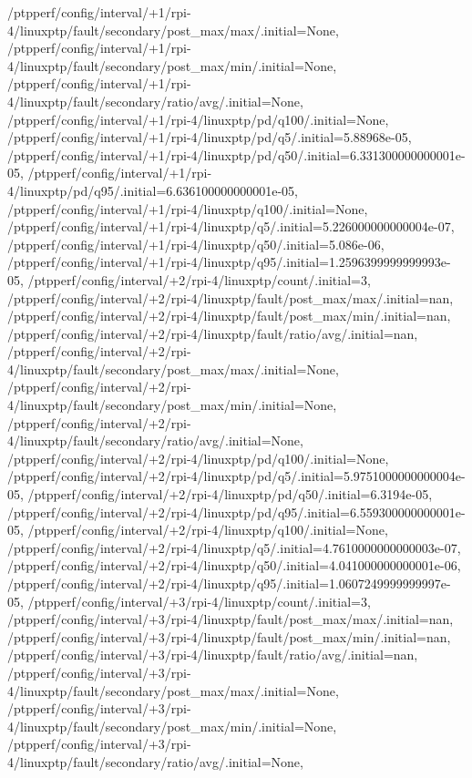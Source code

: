 {    /ptpperf/config/interval/+1/rpi-4/linuxptp/fault/secondary/post_max/max/.initial=None,
    /ptpperf/config/interval/+1/rpi-4/linuxptp/fault/secondary/post_max/min/.initial=None,
    /ptpperf/config/interval/+1/rpi-4/linuxptp/fault/secondary/ratio/avg/.initial=None,
    /ptpperf/config/interval/+1/rpi-4/linuxptp/pd/q100/.initial=None,
    /ptpperf/config/interval/+1/rpi-4/linuxptp/pd/q5/.initial=5.88968e-05,
    /ptpperf/config/interval/+1/rpi-4/linuxptp/pd/q50/.initial=6.331300000000001e-05,
    /ptpperf/config/interval/+1/rpi-4/linuxptp/pd/q95/.initial=6.636100000000001e-05,
    /ptpperf/config/interval/+1/rpi-4/linuxptp/q100/.initial=None,
    /ptpperf/config/interval/+1/rpi-4/linuxptp/q5/.initial=5.226000000000004e-07,
    /ptpperf/config/interval/+1/rpi-4/linuxptp/q50/.initial=5.086e-06,
    /ptpperf/config/interval/+1/rpi-4/linuxptp/q95/.initial=1.2596399999999993e-05,
    /ptpperf/config/interval/+2/rpi-4/linuxptp/count/.initial=3,
    /ptpperf/config/interval/+2/rpi-4/linuxptp/fault/post_max/max/.initial=nan,
    /ptpperf/config/interval/+2/rpi-4/linuxptp/fault/post_max/min/.initial=nan,
    /ptpperf/config/interval/+2/rpi-4/linuxptp/fault/ratio/avg/.initial=nan,
    /ptpperf/config/interval/+2/rpi-4/linuxptp/fault/secondary/post_max/max/.initial=None,
    /ptpperf/config/interval/+2/rpi-4/linuxptp/fault/secondary/post_max/min/.initial=None,
    /ptpperf/config/interval/+2/rpi-4/linuxptp/fault/secondary/ratio/avg/.initial=None,
    /ptpperf/config/interval/+2/rpi-4/linuxptp/pd/q100/.initial=None,
    /ptpperf/config/interval/+2/rpi-4/linuxptp/pd/q5/.initial=5.9751000000000004e-05,
    /ptpperf/config/interval/+2/rpi-4/linuxptp/pd/q50/.initial=6.3194e-05,
    /ptpperf/config/interval/+2/rpi-4/linuxptp/pd/q95/.initial=6.559300000000001e-05,
    /ptpperf/config/interval/+2/rpi-4/linuxptp/q100/.initial=None,
    /ptpperf/config/interval/+2/rpi-4/linuxptp/q5/.initial=4.7610000000000003e-07,
    /ptpperf/config/interval/+2/rpi-4/linuxptp/q50/.initial=4.041000000000001e-06,
    /ptpperf/config/interval/+2/rpi-4/linuxptp/q95/.initial=1.0607249999999997e-05,
    /ptpperf/config/interval/+3/rpi-4/linuxptp/count/.initial=3,
    /ptpperf/config/interval/+3/rpi-4/linuxptp/fault/post_max/max/.initial=nan,
    /ptpperf/config/interval/+3/rpi-4/linuxptp/fault/post_max/min/.initial=nan,
    /ptpperf/config/interval/+3/rpi-4/linuxptp/fault/ratio/avg/.initial=nan,
    /ptpperf/config/interval/+3/rpi-4/linuxptp/fault/secondary/post_max/max/.initial=None,
    /ptpperf/config/interval/+3/rpi-4/linuxptp/fault/secondary/post_max/min/.initial=None,
    /ptpperf/config/interval/+3/rpi-4/linuxptp/fault/secondary/ratio/avg/.initial=None,
}
